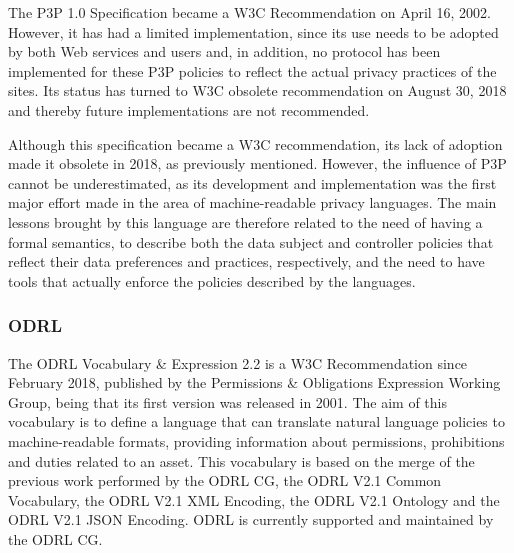 The P3P 1.0 Specification became a W3C Recommendation on April 16, 2002.
However, it has had a limited implementation, since its use needs to be adopted by both Web services and users and, in addition, no protocol has been implemented for these P3P policies to reflect the actual privacy practices of the sites.
Its status has turned to W3C obsolete recommendation on August 30, 2018 and thereby future implementations are not recommended.

Although this specification became a W3C recommendation, its lack of adoption made it obsolete in 2018, as previously mentioned. However, the influence of P3P cannot be underestimated, as its development and implementation was the first major effort made in the area of machine-readable privacy languages. The main lessons brought by this language are therefore related to the need of having a formal semantics, to describe both the data subject and controller policies that reflect their data preferences and practices, respectively, and the need to have tools that actually enforce the policies described by the languages.

\subsubsection{ODRL}
\label{sec:odrl}

The ODRL Vocabulary \& Expression 2.2 \citep{iannella_odrl_2018} is a W3C Recommendation since February 2018, published by the Permissions \& Obligations Expression Working Group, being that its first version was released in 2001.
The aim of this vocabulary is to define a language that can translate natural language policies to machine-readable formats, providing information about permissions, prohibitions and duties related to an asset.
This vocabulary is based on the merge of the previous work performed by the ODRL CG, the ODRL V2.1 Common Vocabulary, the ODRL V2.1 XML Encoding, the ODRL V2.1 Ontology and the ODRL V2.1 JSON Encoding.
ODRL is currently supported and maintained by the ODRL CG.

